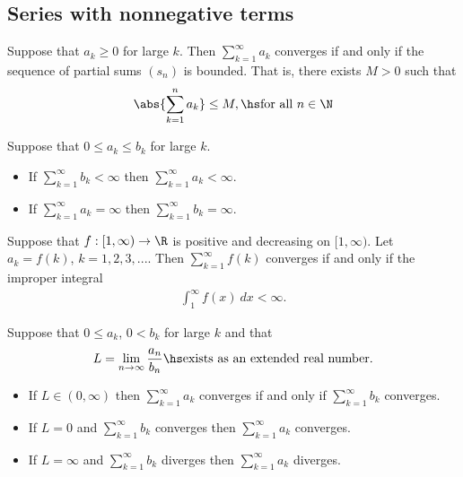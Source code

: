 \documentclass{article}
\begin{document}
\subsection{Series with nonnegative terms}

\begin{theorem}
	Suppose that $a_k\geq 0$ for large $k$. Then $\sum_{k=1}^\infty a_k$ converges
	if and only if the sequence of partial sums $(s_n)$ is bounded. That is,
	there exists $M>0$ such that
	\begin{align*}
		\abs{\sum_{k=1}^na_k}\leq M,\hs\text{for all }n\in\N
	\end{align*}
\end{theorem}

\begin{theorem}
	Suppose that $0\leq a_k\leq b_k$ for large $k$.
	\begin{itemize}
		\item If $\sum_{k=1}^\infty b_k<\infty$ then $\sum_{k=1}^\infty a_k < \infty$.
		\item If $\sum_{k=1}^\infty a_k = \infty$ then $\sum_{k=1}^\infty b_k = \infty$.
	\end{itemize}
\end{theorem}

\begin{theorem}
	Suppose that $f:[1,\infty)\to\R$ is positive and decreasing on
	$[1,\infty)$. Let $a_k=f(k)$, $k=1,2,3,...$. Then $\sum_{k=1}^\infty f(k)$
	converges if and only if the improper integral
	\begin{align*}
		\int_1^\infty f(x)\:dx < \infty.
	\end{align*}
\end{theorem}

\setcounter{theorem}{6}
\begin{theorem}
	Suppose that $0\leq a_k$, $0<b_k$ for large $k$ and that
	\begin{align*}
		L=\lim_{n\to\infty}\frac{a_n}{b_n}\hs\text{exists as an extended real number}.
	\end{align*}
	\begin{itemize}
		\item If $L\in(0,\infty)$ then $\sum_{k=1}^\infty a_k$ converges if and only if $\sum_{k=1}^\infty b_k$ converges.
		\item If $L=0$ and $\sum_{k=1}^\infty b_k$ converges then $\sum_{k=1}^\infty a_k$ converges.
		\item If $L=\infty$ and $\sum_{k=1}^\infty b_k$ diverges then $\sum_{k=1}^\infty a_k$ diverges.
	\end{itemize}
\end{theorem}
\end{document}
